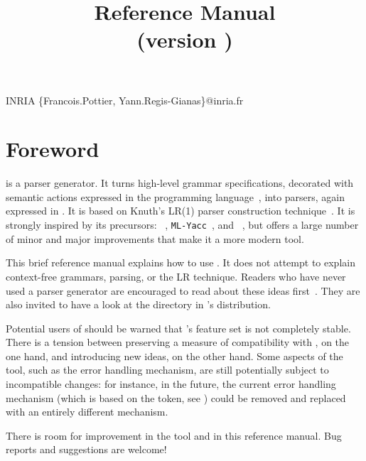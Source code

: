 \documentclass[onecolumn,11pt,nocopyrightspace,preprint]{sigplanconf}
\title{\menhir Reference Manual\\\normalsize (version \menhirversion)}
\begin{document}
	   {INRIA}
	   {\{Francois.Pottier, Yann.Regis-Gianas\}@inria.fr}

\maketitle


\clearpage
\tableofcontents
\clearpage


\section{Foreword}

\menhir is a parser generator. It turns high-level grammar specifications,
decorated with semantic actions expressed in the \ocaml programming
language~\cite{ocaml}, into parsers, again expressed in \ocaml. It is
based on Knuth's LR(1) parser construction technique~\cite{knuth-lr-65}. It is
strongly inspired by its precursors: \yacc~\cite{johnson-yacc-79},
\texttt{ML-Yacc}~\cite{tarditi-appel-00}, and \ocamlyacc~\cite{ocaml},
but offers a large number of minor and major improvements that make it a more
modern tool.

This brief reference manual explains how to use \menhir. It does not attempt to
explain context-free grammars, parsing, or the LR technique. Readers who have
never used a parser generator are encouraged to read about these ideas
first~\cite{aho-86,appel-tiger-98,hopcroft-motwani-ullman-00}. They are also
invited to have a look at the  directory in \menhir's
distribution.

Potential users of \menhir should be warned that \menhir's feature set is not
completely stable. There is a tension between preserving a measure of
compatibility with \ocamlyacc, on the one hand, and introducing new ideas, on
the other hand. Some aspects of the tool, such as the error handling
mechanism, are still potentially subject to incompatible changes: for
instance, in the future, the current error handling mechanism (which is based
on the \error token, see ) could be removed and replaced with
an entirely different mechanism.

There is room for improvement in the tool and in this reference manual. Bug
reports and suggestions are welcome!
\end{document}
